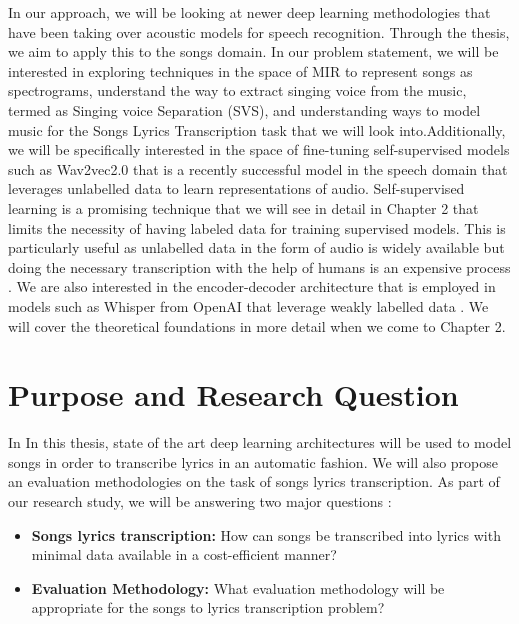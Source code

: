In our approach, we will be looking at newer deep learning methodologies that have been taking over acoustic models for speech recognition. Through the thesis, we aim to apply this to the songs domain. In our problem statement, we will be interested in exploring techniques in the space of MIR to represent songs as spectrograms, understand the way to extract singing voice from the music, termed as Singing voice Separation (SVS), and understanding ways to model music for the Songs Lyrics Transcription task that we will look into.Additionally, we will be specifically interested in the space of fine-tuning self-supervised models such as Wav2vec2.0 that is a recently successful model in the speech domain that leverages unlabelled data to learn representations of audio. Self-supervised learning is a promising technique that we will see in detail in Chapter 2 that limits the necessity of having labeled data for training supervised models. This is particularly useful as unlabelled data in the form of audio is widely available but doing the necessary transcription with the help of humans is an expensive process \cite{baevski2020wav2vec}. We are also interested in the encoder-decoder architecture that is employed in models such as Whisper from OpenAI that leverage weakly labelled data \cite{radford2023robust}. We will cover the theoretical foundations in more detail when we come to Chapter 2.



\section{Purpose and Research Question}%
\label{sec:purpose}

In In this thesis, state of the art deep learning architectures will be used to model songs in order to transcribe lyrics in an automatic fashion. We will also propose an evaluation methodologies on the task of songs lyrics transcription. As part of our research study, we will be answering two major questions : 

\begin{itemize}
    \item \textbf{Songs lyrics transcription:} How can songs be transcribed into lyrics with minimal data available in a cost-efficient manner?
    \item \textbf{Evaluation Methodology:} What evaluation methodology will be appropriate for the songs to lyrics transcription problem?
\end{itemize}



